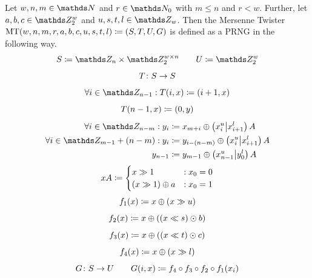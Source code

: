 \documentclass{stdlocal}
\begin{document}
      \begin{definition}
        Let $w, n, m\in \setNatural$ and $r\in\setNatural_0$ with $m \leq n$ and $r < w$.
        Further, let $a,b,c \in \setInteger_2^w$ and $u,s,t,l \in \setInteger_w$.
        Then the Mersenne Twister $\mathrm{MT}(w,n,m,r,a,b,c,u,s,t,l)\coloneqq (S,T,U,G)$ is defined as a PRNG in the following way.
        \[
          S \define \setInteger_n \times \setInteger_2^{w\times n}
          \separate
          U \define \setInteger_2^w
        \]
        \[
          T\colon S\to S
        \]
        \[
          \forall i\in\setInteger_{n-1}: T(i, x) \define (i + 1, x)
        \]
        \[
          T(n-1, x) \coloneqq (0, y)
        \]
        \begin{align*}
          \forall i\in\setInteger_{n-m}: y_i &\define x_{m+i} \oplus \roundBrackets{x_i^u \middle\vert x_{i+1}^l}A \\
          \forall i\in\setInteger_{m-1} + (n-m): y_i &\define y_{i-(n-m)} \oplus \roundBrackets{x_i^u \middle\vert x_{i+1}^l}A \\
          y_{n-1} &\define y_{m-1} \oplus \roundBrackets{x^u_{n-1} \middle\vert y_0^l}A
        \end{align*}
        \[
          xA \coloneqq
          \begin{cases}
            x \gg 1 &: x_0 = 0 \\
            (x \gg 1) \oplus a &: x_0 = 1
          \end{cases}
        \]
        \[
          f_1(x) \coloneqq x \oplus (x \gg u)
        \]
        \[
          f_2(x) \coloneqq x \oplus ((x \ll s) \odot b)
        \]
        \[
          f_3(x) \coloneqq x \oplus ((x \ll t) \odot c)
        \]
        \[
          f_4(x) \coloneqq x \oplus (x \gg l)
        \]
        \[
          G\colon S\to U
          \qquad
          G(i,x) \coloneqq f_4 \circ f_3 \circ f_2 \circ f_1(x_i)
        \]
      \end{definition}
\end{document}
